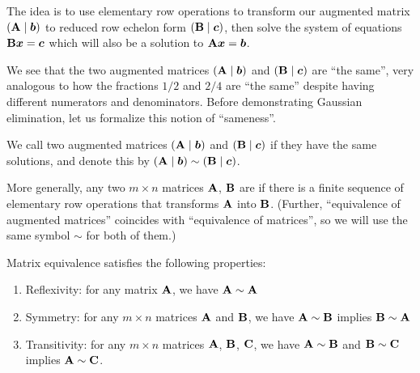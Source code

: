 \M
The idea is to use elementary row operations to transform our augmented
matrix $(\mathbf{A}\mid\boldsymbol{b})$ to reduced row echelon form $(\mathbf{B}\mid\boldsymbol{c})$,
then solve the system of equations $\mathbf{B}\boldsymbol{x}=\boldsymbol{c}$ which will
also be a solution to $\mathbf{A}\boldsymbol{x}=\boldsymbol{b}$.

We see that the two augmented matrices $(\mathbf{A}\mid\boldsymbol{b})$ and
$(\mathbf{B}\mid\boldsymbol{c})$ are ``the same'', very analogous to how the
fractions $1/2$ and $2/4$ are ``the same'' despite having different
numerators and denominators. Before demonstrating Gaussian elimination,
let us formalize this notion of ``sameness''.

\begin{definition}
We call two augmented matrices $(\mathbf{A}\mid\boldsymbol{b})$ and
$(\mathbf{B}\mid\boldsymbol{c})$  if they have the same
solutions, and denote this by $(\mathbf{A}\mid\boldsymbol{b})\sim(\mathbf{B}\mid\boldsymbol{c})$.

More generally, any two $m\times n$ matrices $\mathbf{A}$, $\mathbf{B}$
are  if there is a finite sequence of elementary row
operations that transforms $\mathbf{A}$ into $\mathbf{B}$. (Further,
``equivalence of augmented matrices'' coincides with ``equivalence of matrices'',
so we will use the same symbol $\sim$ for both of them.)
\end{definition}

\begin{proposition}
  Matrix equivalence satisfies the following properties:
  \begin{enumerate}
  \item Reflexivity: for any matrix $\mathbf{A}$, we have $\mathbf{A}\sim\mathbf{A}$
  \item Symmetry: for any $m\times n$ matrices $\mathbf{A}$ and $\mathbf{B}$,
    we have $\mathbf{A}\sim\mathbf{B}$ implies $\mathbf{B}\sim\mathbf{A}$
  \item Transitivity: for any $m\times n$ matrices $\mathbf{A}$, $\mathbf{B}$, $\mathbf{C}$,
    we have $\mathbf{A}\sim\mathbf{B}$ and $\mathbf{B}\sim\mathbf{C}$ implies $\mathbf{A}\sim\mathbf{C}$.
  \end{enumerate}
\end{proposition}


